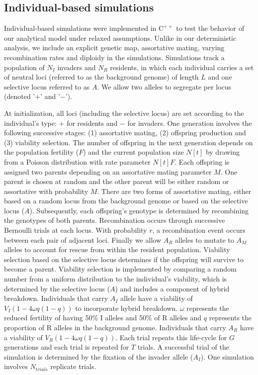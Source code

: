 \documentclass[a4paper,10pt]{article}
\begin{document}
	\subsection{Individual-based simulations}
	
	Individual-based simulations were implemented in $\text{C}^{++}$ to test the behavior of our analytical model under relaxed assumptions. Unlike in our deterministic analysis, we include an explicit genetic map, assortative mating, varying recombination rates and diploidy in the simulations. Simulations track a population of $N_I$ invaders and $N_R$ residents, in which each individual carries a set of neutral loci (referred to as the background genome) of length $L$ and one selective locus referred to as $A$. We allow two alleles to segregate per locus (denoted '$+$' and '$-$'). 
	
	At initialization, all loci (including the selective locus) are set according to the individual's type: $+$ for residents and $-$ for invaders. One generation involves the following successive stages: (1) assortative mating, (2) offspring production and (3) viability selection. The number of offspring in the next generation depends on the population fertility ($F$) and the current population size $N[t]$ by drawing from a Poisson distribution with rate parameter $N[t] F$. Each offspring is assigned two parents depending on an assortative mating parameter $M$. One parent is chosen at random and the other parent will be either random or assortative with probability $M$. There are two forms of assortative mating, either based on a random locus from the background genome or based on the selective locus ($A$). Subsequently, each offspring's genotype is determined by recombining the genotypes of both parents. Recombination occurs through successive Bernoulli trials at each locus. With probability $r$, a recombination event occurs between each pair of adjacent loci. Finally we allow $A_R$ alleles to mutate to $A_M$ alleles to account for rescue from within the resident population. Viability selection based on the selective locus determines if the offspring will survive to become a parent. Viability selection is implemented by comparing a random number from a uniform distribution to the individual's viability, which is determined by the selective locus ($A$) and includes a component of hybrid breakdown. Individuals that carry $A_I$ allele have a viability of $V_I (1 - 4 \omega q (1-q))$ to incorporate hybrid breakdown. $\omega$ represents the reduced fertility of having 50\% I alleles and 50\% of R alleles and $q$ represents the proportion of R alleles in the background genome. Individuals that carry $A_R$ have a viability of $V_R (1 - 4 \omega q (1-q))$. Each trial repeats this life-cycle for $G$ generations and each trial is repeated for $T$ trials. A successful trial of the simulation is determined by the fixation of the invader allele ($A_I$). One simulation involves $N_{trials}$ replicate trials. 
\end{document}

